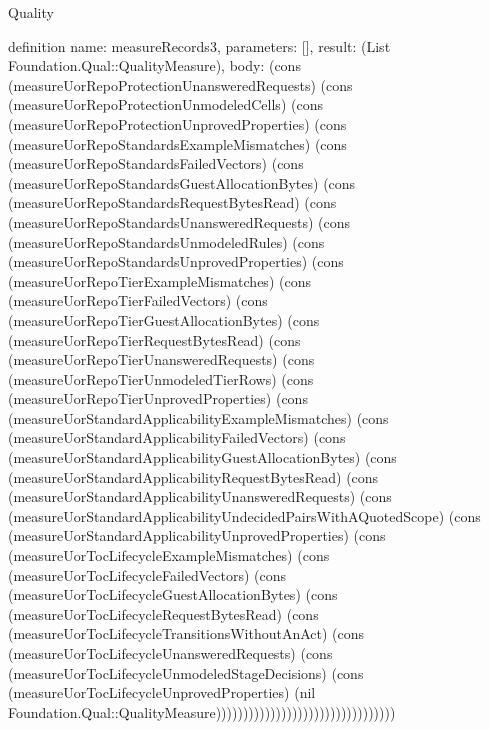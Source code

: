 \begin{lexlean}{Quality}
\begin{semanticmodule}
definition{
  name: measureRecords3,
  parameters: [],
  result: (List Foundation.Qual::QualityMeasure),
  body: (cons (measureUorRepoProtectionUnansweredRequests) (cons (measureUorRepoProtectionUnmodeledCells) (cons (measureUorRepoProtectionUnprovedProperties) (cons (measureUorRepoStandardsExampleMismatches) (cons (measureUorRepoStandardsFailedVectors) (cons (measureUorRepoStandardsGuestAllocationBytes) (cons (measureUorRepoStandardsRequestBytesRead) (cons (measureUorRepoStandardsUnansweredRequests) (cons (measureUorRepoStandardsUnmodeledRules) (cons (measureUorRepoStandardsUnprovedProperties) (cons (measureUorRepoTierExampleMismatches) (cons (measureUorRepoTierFailedVectors) (cons (measureUorRepoTierGuestAllocationBytes) (cons (measureUorRepoTierRequestBytesRead) (cons (measureUorRepoTierUnansweredRequests) (cons (measureUorRepoTierUnmodeledTierRows) (cons (measureUorRepoTierUnprovedProperties) (cons (measureUorStandardApplicabilityExampleMismatches) (cons (measureUorStandardApplicabilityFailedVectors) (cons (measureUorStandardApplicabilityGuestAllocationBytes) (cons (measureUorStandardApplicabilityRequestBytesRead) (cons (measureUorStandardApplicabilityUnansweredRequests) (cons (measureUorStandardApplicabilityUndecidedPairsWithAQuotedScope) (cons (measureUorStandardApplicabilityUnprovedProperties) (cons (measureUorTocLifecycleExampleMismatches) (cons (measureUorTocLifecycleFailedVectors) (cons (measureUorTocLifecycleGuestAllocationBytes) (cons (measureUorTocLifecycleRequestBytesRead) (cons (measureUorTocLifecycleTransitionsWithoutAnAct) (cons (measureUorTocLifecycleUnansweredRequests) (cons (measureUorTocLifecycleUnmodeledStageDecisions) (cons (measureUorTocLifecycleUnprovedProperties) (nil Foundation.Qual::QualityMeasure)))))))))))))))))))))))))))))))))
}


\end{semanticmodule}
\end{lexlean}
